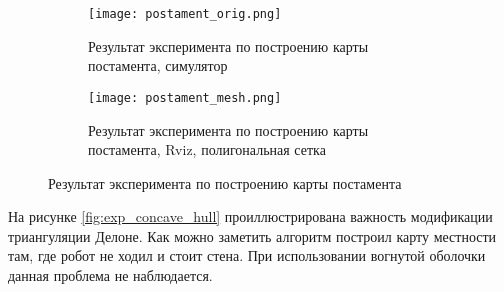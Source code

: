 \begin{figure}[H]
    \begin{subfigure}{0.9\textwidth}
        \centering\texttt{[image: postament\_orig.png]}
        \caption{Результат эксперимента по построению карты постамента, симулятор}
        \label{fig:postament_orig.png}
    \end{subfigure}
    \begin{subfigure}{0.9\textwidth}
        \centering\texttt{[image: postament\_mesh.png]}
        \caption{Результат эксперимента по построению карты постамента, Rviz, полигональная сетка}
        \label{fig:postament_mesh.png}
    \end{subfigure}

    \caption{Результат эксперимента по построению карты постамента}
    \label{fig:}
\end{figure}

На рисунке \ref{fig:exp_concave_hull} проиллюстрирована  важность модификации триангуляции Делоне. Как можно заметить  алгоритм построил карту местности там, где робот не ходил и стоит стена. При использовании вогнутой оболочки  данная проблема не наблюдается.

